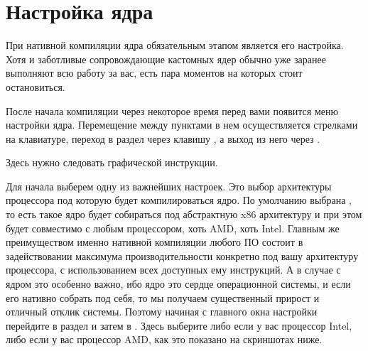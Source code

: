 \documentclass[letterpaper,10pt,russian,openany]{sphinxmanual}
\begin{document}
\section{Настройка ядра}
\label{\detokenize{source/custom-kernels:manual-kernel-configuration}}\label{\detokenize{source/custom-kernels:index-5}}\label{\detokenize{source/custom-kernels:id7}}
\sphinxAtStartPar
При нативной компиляции ядра обязательным этапом является его настройка.
Хотя и заботливые сопровождающие кастомных ядер обычно уже заранее выполняют
всю работу за вас, есть пара моментов на которых стоит остановиться.

\sphinxAtStartPar
После начала компиляции через некоторое время перед вами появится меню настройки ядра.
Перемещение между пунктами в нем осуществляется стрелками на клавиатуре, переход в
раздел через клавишу , а выход из него через .

\sphinxAtStartPar
Здесь нужно следовать графической инструкции.

\sphinxAtStartPar
{} Для начала выберем одну из важнейших настроек. Это выбор архитектуры процессора под которую будет компилироваться ядро.
По умолчанию выбрана , то есть такое ядро будет собираться под абстрактную x86 архитектуру и при этом будет совместимо
с любым процессором, хоть AMD, хоть Intel. Главным же преимуществом именно нативной компиляции любого ПО состоит в задействовании
максимума производительности конкретно под вашу архитектуру процессора, с использованием всех доступных ему инструкций. А в случае
с ядром это особенно важно, ибо ядро это сердце операционной системы, и если его нативно собрать под себя, то мы получаем существенный
прирост и отличный отклик системы. Поэтому начиная с главного окна настройки перейдите в раздел  и затем
в . Здесь выберите либо  если у вас процессор Intel, либо  если
у вас процессор AMD, как это показано на скриншотах ниже.

\sphinxAtStartPar
{}

\noindent{}

\sphinxAtStartPar
{}

\noindent{}
\end{document}
